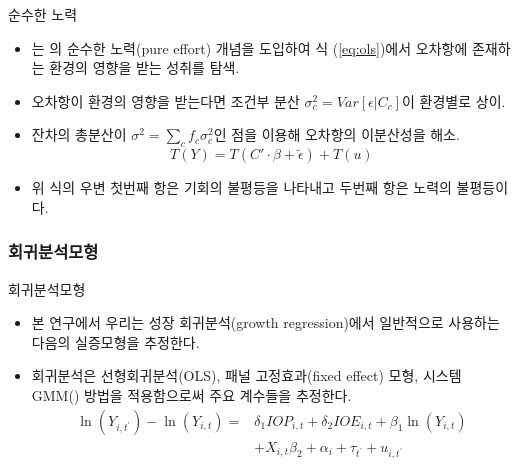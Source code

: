 \documentclass[aspectratio=169,xcolor=dvipsnames,handout]{beamer}
\begin{document}
\begin{frame}{순수한 노력}
    \begin{itemize}
        \item \cite{betl12}는 \cite{Roemer98}의 순수한 노력(pure effort) 개념을 도입하여 식 (\ref{eq:ols})에서 오차항에 존재하는 환경의 영향을 받는 성취를 탐색.
        \item 오차항이 환경의 영향을 받는다면 조건부 분산 $\sigma ^2 _c = Var[\epsilon |C_c]$이 환경별로 상이.
        \item 잔차의 총분산이 $\sigma ^2 =  \sum _c f_c \sigma ^2 _c$인 점을 이용해 오차항의 이분산성을 해소.
        \begin{equation}
            \label{eq:theil0-bjork}
            T(Y)=T(C' \cdot \beta +\widetilde{\epsilon}) + T ( u )
        \end{equation}
        \item 위 식의 우변 첫번째 항은 기회의 불평등을 나타내고 두번째 항은 노력의 불평등이다.
    \end{itemize}
\end{frame}

\subsubsection{회귀분석모형}
\begin{frame}{회귀분석모형}
   \begin{itemize}
       \item  본 연구에서 우리는 성장 회귀분석(growth regression)에서 일반적으로 사용하는 다음의 실증모형을 추정한다.
       \item 회귀분석은 선형회귀분석(OLS), 패널 고정효과(fixed effect) 모형, 시스템 GMM(\cite{bnb98}) 방법을 적용함으로써 주요 계수들을 추정한다.
       \begin{equation}
            \begin{aligned}
            \ln \left(Y_{i, t^{\prime}}\right)-\ln \left(Y_{i, t}\right)=& \delta_{1} I O P_{i, t}+\delta_{2} I O E_{i, t}+\beta_{1} \ln \left(Y_{i, t}\right) \\
            &+X_{i, t} \beta_{2} +\alpha_{i}+\tau_{t^{\prime}}+u_{i, t^{\prime}}
            \end{aligned}
            \label{eq:regbase}
       \end{equation} 
   \end{itemize} 
\end{frame}
 
\end{document}
